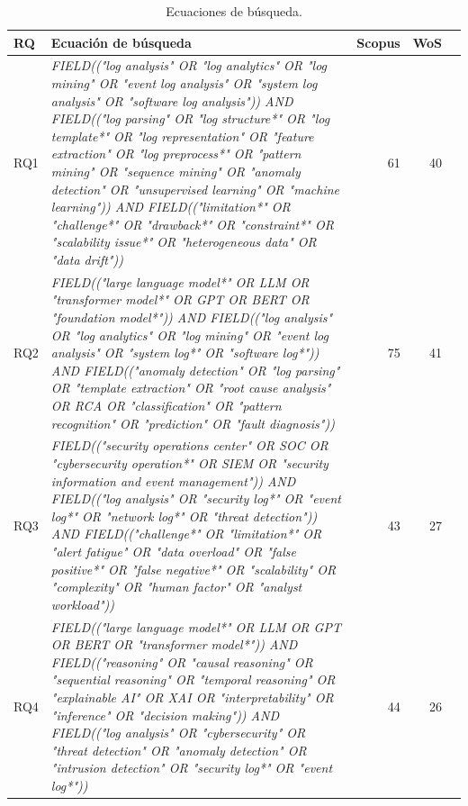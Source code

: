 \begin{table}[H]
\centering
\renewcommand{\arraystretch}{1.1}
\renewcommand{\tablename}{Table}
\setlength{\arrayrulewidth}{0.5pt}
\begin{tabularx}{0.95\textwidth}{@{} l X r r r@{}}
\toprule
\hline
\textbf{RQ} & \textbf{Ecuación de búsqueda} & \textbf{Scopus} & \textbf{WoS}\\
\hline
\midrule
RQ1 &
\textsl{FIELD(("log analysis" OR "log analytics" OR "log mining" OR "event log analysis" OR 
"system log analysis" OR "software log analysis"))
AND
FIELD(("log parsing" OR "log structure*" OR "log template*" OR "log representation" OR 
"feature extraction" OR "log preprocess*" OR "pattern mining" OR "sequence mining" OR 
"anomaly detection" OR "unsupervised learning" OR "machine learning"))
AND
FIELD(("limitation*" OR "challenge*" OR "drawback*" OR "constraint*" OR 
"scalability issue*" OR "heterogeneous data" OR "data drift"))} & 61 & 40 \\[0.8em]
\hline
RQ2 &
\textsl{FIELD(("large language model*" OR LLM OR "transformer model*" OR GPT OR BERT OR 
"foundation model*"))
AND
FIELD(("log analysis" OR "log analytics" OR "log mining" OR "event log analysis" OR 
"system log*" OR "software log*"))
AND
FIELD(("anomaly detection" OR "log parsing" OR "template extraction" OR 
"root cause analysis" OR RCA OR "classification" OR "pattern recognition" OR 
"prediction" OR "fault diagnosis"))} & 75 & 41\\
\hline
RQ3 &
\textsl{FIELD(("security operations center" OR SOC OR "cybersecurity operation*" OR SIEM OR 
"security information and event management"))
AND
FIELD(("log analysis" OR "security log*" OR "event log*" OR "network log*" OR 
"threat detection"))
AND
FIELD(("challenge*" OR "limitation*" OR "alert fatigue" OR "data overload" OR 
"false positive*" OR "false negative*" OR "scalability" OR "complexity" OR 
"human factor" OR "analyst workload"))} & 43 & 27\\[0.8em]
\hline
RQ4 &
\textsl{FIELD(("large language model*" OR LLM OR GPT OR BERT OR "transformer model*"))
AND
FIELD(("reasoning" OR "causal reasoning" OR "sequential reasoning" OR 
"temporal reasoning" OR "explainable AI" OR XAI OR "interpretability" OR 
"inference" OR "decision making"))
AND
FIELD(("log analysis" OR "cybersecurity" OR "threat detection" OR 
"anomaly detection" OR "intrusion detection" OR "security log*" OR "event log*"))} & 44 & 26\\
\bottomrule
\end{tabularx}
\caption{Ecuaciones de búsqueda.}
\label{tab:busqueda_rqs}
\end{table}


